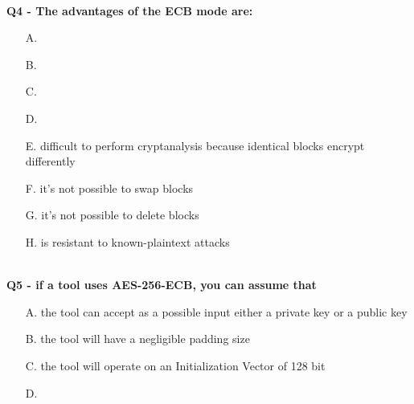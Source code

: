 \textbf{\\Q4 - The advantages of the ECB mode are:}
\begin{enumerate}
	\item[A.] 
	\item[B.] 
	\item[C.] 
	\item[D.] 
	\item[E.] difficult to perform cryptanalysis because identical blocks encrypt differently
	\item[F.] it’s not possible to swap blocks
	\item[G.] it’s not possible to delete blocks
	\item[H.] is resistant to known-plaintext attacks
\end{enumerate}


\textbf{\\Q5 - if a tool uses AES-256-ECB, you can assume that}
\begin{enumerate}
	\item[A.] the tool can accept as a possible input either a private key or a public key
	\item[B.] the tool will have a negligible padding size
	\item[C.] the tool will operate on an Initialization Vector of 128 bit
	\item[D.] 
\end{enumerate}


